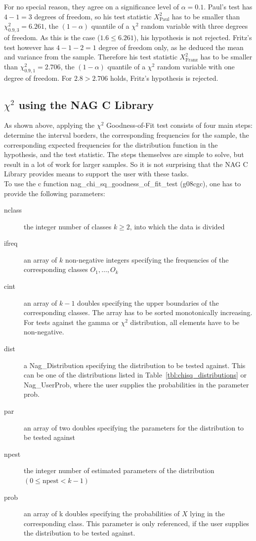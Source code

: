 \documentclass{article}
\theoremstyle{definition}
\newcommand{\reftbl}[1]{Table~\ref{#1}}
\begin{document}
%
For no special reason, they agree on a significance level of $\alpha = 0.1$.
Paul's test has $4-1=3$ degrees of freedom, so his test statistic $X^2_{\text{Paul}}$ has to be smaller than $\chi^2_{0.9, 3} = 6.261$, the $(1-\alpha)$ quantile of a $\chi^2$ random variable with three degrees of freedom.
As this is the case ($1.6 \leq 6.261$), his hypothesis is not rejected.
Fritz's test however has $4-1-2=1$ degree of freedom only, as he deduced the mean and variance from the sample.
Therefore his test statistic $X^2_{\text{Franz}}$ has to be smaller than $\chi^2_{0.9, 1} = 2.706$, the $(1-\alpha)$ quantile of a $\chi^2$ random variable with one degree of freedom.
For $2.8 > 2.706$ holds, Fritz's hypothesis is rejected.

\subsection{$\chi^2$ using the NAG C Library}
As shown above, applying the $\chi^2$ Goodness-of-Fit test consists of four main steps: determine the interval borders, the corresponding frequencies for the sample, the corresponding expected frequencies for the distribution function in the hypothesis, and the test statistic.
The steps themselves are simple to solve, but result in a lot of work for larger samples.
So it is not surprising that the NAG C Library provides means to support the user with these tasks.
\\
To use the c function nag\_chi\_sq\_goodness\_of\_fit\_test (g08cgc), one has to provide the following parameters:
\begin{description}
	\item[nclass] the integer number of classes $k\geq 2$, into which the data is divided
	\item[ifreq] an array of $k$ non-negative integers specifying the frequencies of the corresponding classes $O_{1}, \ldots, O_{k}$
	\item[cint] an array of $k-1$ doubles specifying the upper boundaries of the corresponding classes.
		The array has to be sorted monotonically increasing.
		For tests against the gamma or $\chi^2$ distribution, all elements have to be non-negative.
	\item[dist] a Nag\_Distribution specifying the distribution to be tested against. This can be one of the distributions listed in \reftbl{tbl:chisq_distributions} or Nag\_UserProb, where the user supplies the probabilities in the parameter prob.
	\item[par] an array of two doubles specifying the parameters for the distribution to be tested against
	\item[npest] the integer number of estimated parameters of the distribution $(0\leq\text{npest}<k-1)$
	\item[prob] an array of k doubles specifying the probabilities of $X$ lying in the corresponding class.
		This parameter is only referenced, if the user supplies the distribution to be tested against.
\end{description}
\end{document}

